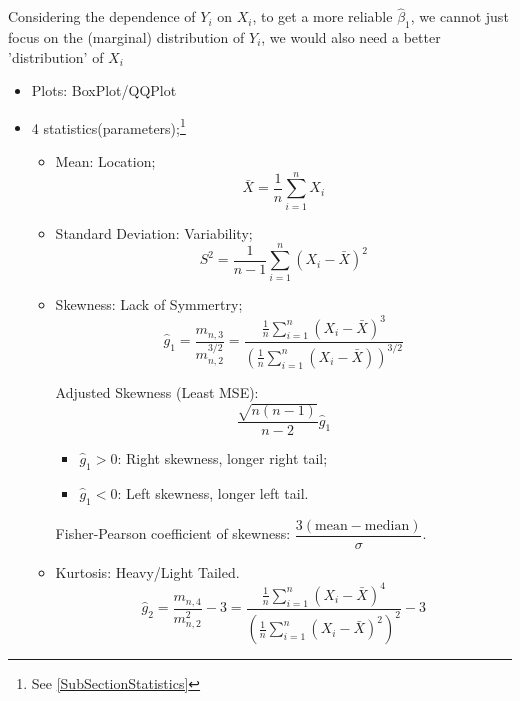     Considering the dependence of $ Y_i $ on $ X_i $, to get a more reliable $ \hat{\beta }_1 $, we cannot just focus on the (marginal) distribution of $ Y_i $, we would also need a better 'distribution' of $ X_i $
    \begin{itemize}[topsep=2pt,itemsep=2pt]
        \item Plots: BoxPlot/QQPlot
        \item 4 statistics(parameters);\footnote{See \autoref{SubSectionStatistics}}
        \begin{itemize}[topsep=2pt,itemsep=2pt]
            \item Mean: Location;
            \begin{equation}
                \bar{X}=\dfrac{1}{n}\sum_{i=1}^nX_i 
            \end{equation}
            \item Standard Deviation: Variability;
            \begin{equation}
                S^2=\dfrac{1}{n-1}\sum_{i=1}^n(X_i-\bar{X}) ^2
            \end{equation}
            
            
            \item Skewness: Lack of Symmertry;
            \begin{equation}
                \hat{g}_1=\dfrac{m_{n,3}}{m_{n,2}^{3/2}}=\dfrac{\frac{1}{n}\sum\limits_{i=1}^n(X_i-\bar{X})^3}{\left( \frac{1}{n}\sum\limits_{i=1}^n(X_i-\bar{X}) \right)^{3/2}} 
            \end{equation}

            Adjusted Skewness (Least MSE):
            \begin{equation}
                \dfrac{\sqrt{n(n-1)}}{n-2}\hat{g}_1 
            \end{equation}
            
            \begin{itemize}[topsep=2pt,itemsep=2pt]
                \item $ \hat{g}_1>0 $: Right skewness, longer right tail;
                \item $ \hat{g}_1<0 $: Left skewness, longer left tail.
            \end{itemize}
            
                
            Fisher-Pearson coefficient of skewness: $ \dfrac{3(\mathrm{mean}-\mathrm{median})}{\sigma } $.


            \item Kurtosis: Heavy/Light Tailed.
            \begin{equation}
                \hat{g}_2=\dfrac{m_{n,4}}{m_{n,2}^2}-3= \dfrac{\frac{1}{n}\sum\limits_{i=1}^n(X_i-\bar{X})^4}{\left( \frac{1}{n}\sum\limits_{i=1}^n(X_i-\bar{X})^2 \right)^{2}} -3
            \end{equation}


\end{itemize}
\end{itemize}
